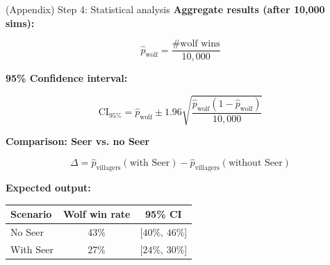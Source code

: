 \documentclass[10pt]{beamer}
\begin{document}
\begin{frame}{(Appendix) Step 4: Statistical analysis}
  \textbf{Aggregate results (after 10,000 sims):}
  
  $$\hat{p}_{\text{wolf}} = \frac{\# \text{wolf wins}}{10,000}$$
  
  \vspace{0.3cm}
  \textbf{95\% Confidence interval:}
  
  $$\text{CI}_{95\%} = \hat{p}_{\text{wolf}} \pm 1.96 \sqrt{\frac{\hat{p}_{\text{wolf}}(1-\hat{p}_{\text{wolf}})}{10,000}}$$

  \vspace{0.3cm}
  \textbf{Comparison: Seer vs. no Seer}
  
  $$\Delta = \hat{p}_{\text{villagers}}(\text{with Seer}) - \hat{p}_{\text{villagers}}(\text{without Seer})$$

  \vspace{0.3cm}
  \textbf{Expected output:}
  \begin{center}
    \begin{tabular}{lcc}
      \hline
      \textbf{Scenario} & \textbf{Wolf win rate} & \textbf{95\% CI} \\
      \hline
      No Seer & 43\% & [$40\%$, $46\%$] \\
      With Seer & 27\% & [$24\%$, $30\%$] \\
      \hline
    \end{tabular}
  \end{center}

\end{frame}
\end{document}
